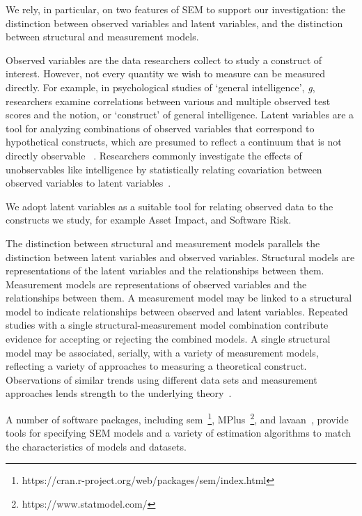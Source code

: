 We rely, in particular, on two features of SEM to support our investigation: the distinction between observed variables and latent variables, and the distinction between structural and measurement models.  

Observed variables are the data researchers collect to study a construct of interest. However, not every quantity we wish to measure can be measured directly. For example, in psychological studies of `general intelligence', \textit{g}, researchers examine correlations between various and multiple observed test scores and the notion, or `construct' of general intelligence. Latent variables are a tool for analyzing combinations of observed variables that correspond to hypothetical constructs, which are presumed to reflect a continuum that is not directly observable ~\cite{kline2015principles}. Researchers commonly investigate the effects of unobservables like intelligence by statistically relating covariation between observed variables to latent variables~\cite{borsboom2003theoretical}.  

We adopt latent variables as a suitable tool for relating observed data to the constructs we study, for example Asset Impact, and Software Risk.

The distinction between structural and measurement models parallels the distinction between latent variables and observed variables. Structural models are representations of the latent variables and the relationships between them. Measurement models are representations of observed variables and the relationships between them.  A measurement model may be linked to a structural model to indicate relationships between observed and latent variables. Repeated studies with a single structural-measurement model combination contribute evidence for accepting or rejecting the combined models. A single structural model may be associated, serially, with a variety of measurement models, reflecting a variety of approaches to measuring a theoretical construct.  Observations of similar trends using different data sets and measurement approaches lends strength to the underlying theory~\cite{basili1999building,wohlin2000experimentation}. 

A number of software packages, including sem~\footnote{https://cran.r-project.org/web/packages/sem/index.html}, MPlus~\footnote{https://www.statmodel.com/}, and lavaan~\cite{roseel2012lavaan}, provide tools for specifying SEM models and a variety of estimation algorithms to match the characteristics of models and datasets. 

